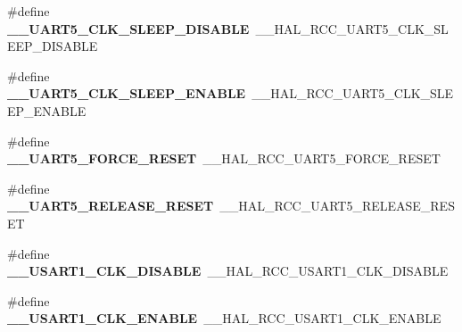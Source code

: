\begin{DoxyCompactItemize}
\item 
\hypertarget{group___h_a_l___r_c_c___aliased_ga82f8f6e08fbeea0ab37d22c5d02526ea}{\#define {\bfseries \-\_\-\-\_\-\-U\-A\-R\-T5\-\_\-\-C\-L\-K\-\_\-\-S\-L\-E\-E\-P\-\_\-\-D\-I\-S\-A\-B\-L\-E}~\-\_\-\-\_\-\-H\-A\-L\-\_\-\-R\-C\-C\-\_\-\-U\-A\-R\-T5\-\_\-\-C\-L\-K\-\_\-\-S\-L\-E\-E\-P\-\_\-\-D\-I\-S\-A\-B\-L\-E}\label{group___h_a_l___r_c_c___aliased_ga82f8f6e08fbeea0ab37d22c5d02526ea}

\item 
\hypertarget{group___h_a_l___r_c_c___aliased_ga4a91f9d4af6a747b6e37e343101c4757}{\#define {\bfseries \-\_\-\-\_\-\-U\-A\-R\-T5\-\_\-\-C\-L\-K\-\_\-\-S\-L\-E\-E\-P\-\_\-\-E\-N\-A\-B\-L\-E}~\-\_\-\-\_\-\-H\-A\-L\-\_\-\-R\-C\-C\-\_\-\-U\-A\-R\-T5\-\_\-\-C\-L\-K\-\_\-\-S\-L\-E\-E\-P\-\_\-\-E\-N\-A\-B\-L\-E}\label{group___h_a_l___r_c_c___aliased_ga4a91f9d4af6a747b6e37e343101c4757}

\item 
\hypertarget{group___h_a_l___r_c_c___aliased_gaa862c1dd316cef6f49cf1d8b75fc98ab}{\#define {\bfseries \-\_\-\-\_\-\-U\-A\-R\-T5\-\_\-\-F\-O\-R\-C\-E\-\_\-\-R\-E\-S\-E\-T}~\-\_\-\-\_\-\-H\-A\-L\-\_\-\-R\-C\-C\-\_\-\-U\-A\-R\-T5\-\_\-\-F\-O\-R\-C\-E\-\_\-\-R\-E\-S\-E\-T}\label{group___h_a_l___r_c_c___aliased_gaa862c1dd316cef6f49cf1d8b75fc98ab}

\item 
\hypertarget{group___h_a_l___r_c_c___aliased_gac1d6aac067f40a8881b272393db61725}{\#define {\bfseries \-\_\-\-\_\-\-U\-A\-R\-T5\-\_\-\-R\-E\-L\-E\-A\-S\-E\-\_\-\-R\-E\-S\-E\-T}~\-\_\-\-\_\-\-H\-A\-L\-\_\-\-R\-C\-C\-\_\-\-U\-A\-R\-T5\-\_\-\-R\-E\-L\-E\-A\-S\-E\-\_\-\-R\-E\-S\-E\-T}\label{group___h_a_l___r_c_c___aliased_gac1d6aac067f40a8881b272393db61725}

\item 
\hypertarget{group___h_a_l___r_c_c___aliased_gaa5da6139eb7a5c1432f3bbdb29021f03}{\#define {\bfseries \-\_\-\-\_\-\-U\-S\-A\-R\-T1\-\_\-\-C\-L\-K\-\_\-\-D\-I\-S\-A\-B\-L\-E}~\-\_\-\-\_\-\-H\-A\-L\-\_\-\-R\-C\-C\-\_\-\-U\-S\-A\-R\-T1\-\_\-\-C\-L\-K\-\_\-\-D\-I\-S\-A\-B\-L\-E}\label{group___h_a_l___r_c_c___aliased_gaa5da6139eb7a5c1432f3bbdb29021f03}

\item 
\hypertarget{group___h_a_l___r_c_c___aliased_gae10e7a83f9766bc578dbc39727751fa8}{\#define {\bfseries \-\_\-\-\_\-\-U\-S\-A\-R\-T1\-\_\-\-C\-L\-K\-\_\-\-E\-N\-A\-B\-L\-E}~\-\_\-\-\_\-\-H\-A\-L\-\_\-\-R\-C\-C\-\_\-\-U\-S\-A\-R\-T1\-\_\-\-C\-L\-K\-\_\-\-E\-N\-A\-B\-L\-E}\label{group___h_a_l___r_c_c___aliased_gae10e7a83f9766bc578dbc39727751fa8}


\end{DoxyCompactItemize}
